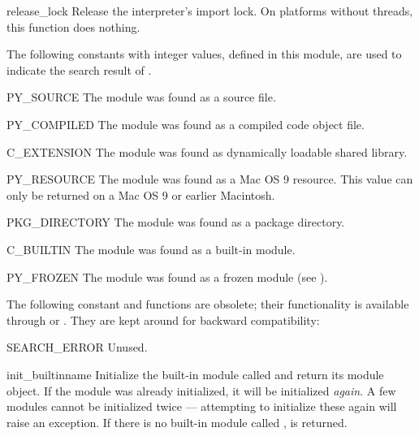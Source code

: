 \begin{funcdesc}{release_lock}{}
Release the interpreter's import lock.
On platforms without threads, this function does nothing.
\end{funcdesc}

The following constants with integer values, defined in this module,
are used to indicate the search result of .

\begin{datadesc}{PY_SOURCE}
The module was found as a source file.
\end{datadesc}

\begin{datadesc}{PY_COMPILED}
The module was found as a compiled code object file.
\end{datadesc}

\begin{datadesc}{C_EXTENSION}
The module was found as dynamically loadable shared library.
\end{datadesc}

\begin{datadesc}{PY_RESOURCE}
The module was found as a Mac OS 9 resource.  This value can only be
returned on a Mac OS 9 or earlier Macintosh.
\end{datadesc}

\begin{datadesc}{PKG_DIRECTORY}
The module was found as a package directory.
\end{datadesc}

\begin{datadesc}{C_BUILTIN}
The module was found as a built-in module.
\end{datadesc}

\begin{datadesc}{PY_FROZEN}
The module was found as a frozen module (see ).
\end{datadesc}

The following constant and functions are obsolete; their functionality
is available through  or .
They are kept around for backward compatibility:

\begin{datadesc}{SEARCH_ERROR}
Unused.
\end{datadesc}

\begin{funcdesc}{init_builtin}{name}
Initialize the built-in module called  and return its module
object.  If the module was already initialized, it will be initialized
\emph{again}.  A few modules cannot be initialized twice --- attempting
to initialize these again will raise an 
exception.  If there is no
built-in module called ,  is returned.
\end{funcdesc}

